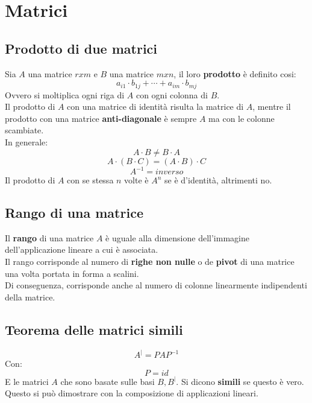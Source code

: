 \documentclass[12pt,a4paper]{article}
\let\oldsection\section
\renewcommand{\section}{\clearpage\oldsection}
\begin{document}
\section{Matrici}

\subsection{Prodotto di due matrici}
Sia $A$ una matrice $rxm$ e $B$ una matrice $mxn$, il loro \textbf{prodotto} è definito cosi:
\[
a_{i1} \cdot b_{1j} + \cdots + a_{im} \cdot b_{mj}
\]
Ovvero si moltiplica ogni riga di $A$ con ogni colonna di $B$.\\
Il prodotto di $A$ con una matrice di identità risulta la matrice di $A$, mentre il prodotto con una matrice \textbf{anti-diagonale} è sempre $A$ ma con le colonne scambiate.\\
In generale:
\[
A \cdot B \ne B \cdot A
\]
\[
A \cdot (B \cdot C) = (A \cdot B) \cdot C
\]
\[
A^{-1} = inverso
\]
Il prodotto di $A$ con se stessa $n$ volte è $A^n$ se è d'identità, altrimenti no.\\

\subsection{Rango di una matrice}
Il \textbf{rango} di una matrice $A$ è uguale alla dimensione dell'immagine dell'applicazione lineare a cui è associata.\\
Il rango corrisponde al numero di \textbf{righe non nulle} o de \textbf{pivot} di una matrice una volta portata in forma a scalini.\\
Di conseguenza, corrisponde anche al numero di colonne linearmente indipendenti della matrice.

\subsection{Teorema delle matrici simili}
\[
A^| = PAP^{-1}
\]
Con:
\[
P = id
\]
E le matrici $A$ che sono basate sulle basi $B,B^|$. Si dicono \textbf{simili} se questo è vero. Questo si può dimostrare con la composizione di applicazioni lineari.
\end{document}
